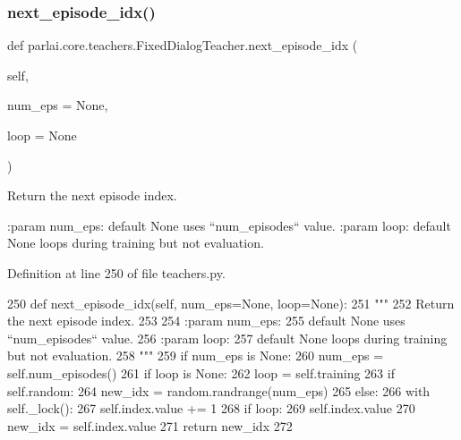\subsubsection{\texorpdfstring{next\+\_\+episode\+\_\+idx()}{next\_episode\_idx()}}
{\footnotesize\ttfamily def parlai.\+core.\+teachers.\+Fixed\+Dialog\+Teacher.\+next\+\_\+episode\+\_\+idx (\begin{DoxyParamCaption}\item[{}]{self,  }\item[{}]{num\+\_\+eps = {\ttfamily None},  }\item[{}]{loop = {\ttfamily None} }\end{DoxyParamCaption})}

\begin{DoxyVerb}Return the next episode index.

:param num_eps:
    default None uses ``num_episodes`` value.
:param loop:
    default None loops during training but not evaluation.
\end{DoxyVerb}
 

Definition at line 250 of file teachers.\+py.


\begin{DoxyCode}
250     \textcolor{keyword}{def }next\_episode\_idx(self, num\_eps=None, loop=None):
251         \textcolor{stringliteral}{"""}
252 \textcolor{stringliteral}{        Return the next episode index.}
253 \textcolor{stringliteral}{}
254 \textcolor{stringliteral}{        :param num\_eps:}
255 \textcolor{stringliteral}{            default None uses ``num\_episodes`` value.}
256 \textcolor{stringliteral}{        :param loop:}
257 \textcolor{stringliteral}{            default None loops during training but not evaluation.}
258 \textcolor{stringliteral}{        """}
259         \textcolor{keywordflow}{if} num\_eps \textcolor{keywordflow}{is} \textcolor{keywordtype}{None}:
260             num\_eps = self.num\_episodes()
261         \textcolor{keywordflow}{if} loop \textcolor{keywordflow}{is} \textcolor{keywordtype}{None}:
262             loop = self.training
263         \textcolor{keywordflow}{if} self.random:
264             new\_idx = random.randrange(num\_eps)
265         \textcolor{keywordflow}{else}:
266             with self.\_lock():
267                 self.index.value += 1
268                 \textcolor{keywordflow}{if} loop:
269                     self.index.value %
270                 new\_idx = self.index.value
271         \textcolor{keywordflow}{return} new\_idx
272 
\end{DoxyCode}
\mbox{\label{classparlai_1_1core_1_1teachers_1_1FixedDialogTeacher_aa6782a610b00aa0675522aa58b03f20c}} 

